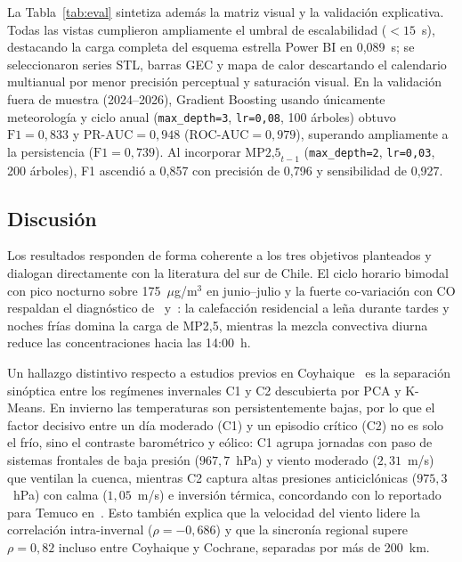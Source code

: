 \documentclass[conference]{IEEEtran}
\begin{document}
La Tabla~\ref{tab:eval} sintetiza adem{\'a}s la matriz visual y la validaci{\'o}n explicativa. Todas las vistas cumplieron ampliamente el umbral de escalabilidad ($<15$~s), destacando la carga completa del esquema estrella Power BI en 0,089~s; se seleccionaron series STL, barras GEC y mapa de calor descartando el calendario multianual por menor precisi{\'o}n perceptual y saturaci{\'o}n visual. En la validaci{\'o}n fuera de muestra (2024--2026), Gradient Boosting usando {\'u}nicamente meteorolog{\'i}a y ciclo anual (\texttt{max\_depth=3}, \texttt{lr=0,08}, 100 {\'a}rboles) obtuvo $\text{F1}=0,833$ y $\text{PR-AUC}=0,948$ ($\text{ROC-AUC}=0,979$), superando ampliamente a la persistencia ($\text{F1}=0,739$). Al incorporar $\text{MP2,5}_{t-1}$ (\texttt{max\_depth=2}, \texttt{lr=0,03}, 200 {\'a}rboles), F1 ascendi{\'o} a 0,857 con precisi{\'o}n de 0,796 y sensibilidad de 0,927.

\subsection{Discusi{\'o}n}
Los resultados responden de forma coherente a los tres objetivos planteados y dialogan directamente con la literatura del sur de Chile. El ciclo horario bimodal con pico nocturno sobre 175~$\mu$g/m$^3$ en junio--julio y la fuerte co-variaci{\'o}n con CO respaldan el diagn{\'o}stico de~\cite{molina2017} y~\cite{solis2022}: la calefacci{\'o}n residencial a le{\~n}a durante tardes y noches fr{\'i}as domina la carga de MP2,5, mientras la mezcla convectiva diurna reduce las concentraciones hacia las 14:00~h.

Un hallazgo distintivo respecto a estudios previos en Coyhaique~\cite{solis2022} es la separaci{\'o}n sin{\'o}ptica entre los reg{\'i}menes invernales C1 y C2 descubierta por PCA y K-Means. En invierno las temperaturas son persistentemente bajas, por lo que el factor decisivo entre un d{\'i}a moderado (C1) y un episodio cr{\'i}tico (C2) no es solo el fr{\'i}o, sino el contraste barom{\'e}trico y e{\'o}lico: C1 agrupa jornadas con paso de sistemas frontales de baja presi{\'o}n ($967{,}7$~hPa) y viento moderado ($2{,}31$~m/s) que ventilan la cuenca, mientras C2 captura altas presiones anticicl{\'o}nicas ($975{,}3$~hPa) con calma ($1{,}05$~m/s) e inversi{\'o}n t{\'e}rmica, concordando con lo reportado para Temuco en~\cite{martinez2025}. Esto tambi{\'e}n explica que la velocidad del viento lidere la correlaci{\'o}n intra-invernal ($\rho=-0,686$) y que la sincron{\'i}a regional supere $\rho=0,82$ incluso entre Coyhaique y Cochrane, separadas por m{\'a}s de 200~km.
\end{document}
